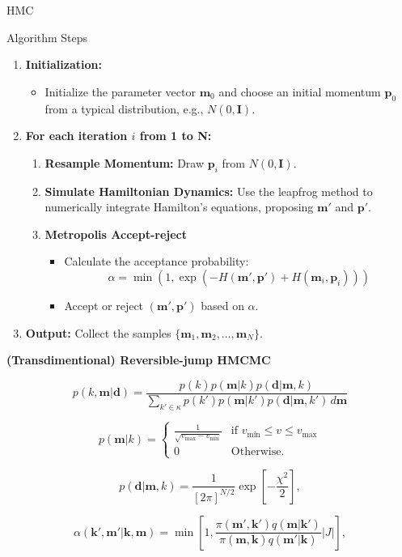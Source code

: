 \documentclass[aspectratio=169]{beamer}
\begin{document}
\begin{frame}{HMC}
\begin{block}{Algorithm Steps}
\begin{enumerate}
    \item \textbf{Initialization:}
    \begin{itemize}
        \item Initialize the parameter vector \( \mathbf{m}_0 \) and choose an initial momentum \( \mathbf{p}_0 \) from a typical distribution, e.g., \( N(0, \mathbf{I}) \).
    \end{itemize}
    
    \item \textbf{For each iteration \( i \) from 1 to N:}
    \begin{enumerate}
        \item \textbf{Resample Momentum:} Draw \( \mathbf{p}_i \) from \( N(0, \mathbf{I}) \).
        \item \textbf{Simulate Hamiltonian Dynamics:} Use the leapfrog method to numerically integrate Hamilton's equations, proposing \( \mathbf{m}' \) and \( \mathbf{p}' \).
        \item \textbf{Metropolis Accept-reject}
        \begin{itemize}
            \item Calculate the acceptance probability:
            \[
            \alpha = \min\left(1, \exp(-H(\mathbf{m}', \mathbf{p}') + H(\mathbf{m}_i, \mathbf{p}_i))\right)
            \]
            \item Accept or reject \( (\mathbf{m}', \mathbf{p}') \) based on \( \alpha \).
        \end{itemize}
    \end{enumerate}
    
    \item \textbf{Output:} Collect the samples \( \{\mathbf{m}_1, \mathbf{m}_2, \ldots, \mathbf{m}_N\} \).
\end{enumerate}
\end{block}
\end{frame}



\begin{frame}{\textbf{(Transdimentional) Reversible-jump HMCMC} }

\[ p(k, \mathbf{m}|\mathbf{d}) = \frac{p(k) p(\mathbf{m}|k) p(\mathbf{d}|\mathbf{m},k)}{\sum_{k' \in \kappa} p(k') p(\mathbf{m}|k') p(\mathbf{d}|\mathbf{m},k') \, d\mathbf{m}} 
\]

\[
p(\mathbf{m}|k) = 
\begin{cases}
\frac{1}{\sqrt{v_{\text{max}} - v_{\text{min}}}} & \text{if } v_{\text{min}} \leq v \leq v_{\text{max}} \\
0 & \text{Otherwise.}
\end{cases}
\]

\[
p(\mathbf{d}|\mathbf{m}, k) = \frac{1}{[2\pi]^{N/2}} \exp\left[ -\frac{\chi^2}{2} \right], 
\]


\[
\alpha(\mathbf{k}', \mathbf{m}'|\mathbf{k}, \mathbf{m}) = \min \left[ 1, \frac{\pi(\mathbf{m}', \mathbf{k}') q(\mathbf{m}|\mathbf{k}')}{\pi(\mathbf{m}, \mathbf{k}) q(\mathbf{m}'|\mathbf{k})} |J| \right],
\]
\end{frame}
\end{document}
